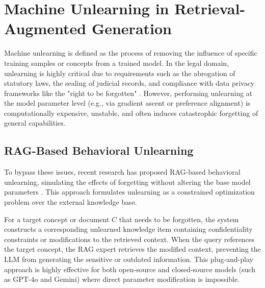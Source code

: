 \section{Machine Unlearning in Retrieval-Augmented Generation}

Machine unlearning is defined as the process of removing the influence of specific training samples or concepts from a trained model. In the legal domain, unlearning is highly critical due to requirements such as the abrogation of statutory laws, the sealing of judicial records, and compliance with data privacy frameworks like the "right to be forgotten" \parencite{11207222}. However, performing unlearning at the model parameter level (e.g., via gradient ascent or preference alignment) is computationally expensive, unstable, and often induces catastrophic forgetting of general capabilities.

\subsection{RAG-Based Behavioral Unlearning}
To bypass these issues, recent research has proposed RAG-based behavioral unlearning, simulating the effects of forgetting without altering the base model parameters \parencite{11207222}. This approach formulates unlearning as a constrained optimization problem over the external knowledge base. 

For a target concept or document $C$ that needs to be forgotten, the system constructs a corresponding unlearned knowledge item containing confidentiality constraints or modifications to the retrieved context. When the query references the target concept, the RAG expert retrieves the modified context, preventing the LLM from generating the sensitive or outdated information. This plug-and-play approach is highly effective for both open-source and closed-source models (such as GPT-4o and Gemini) where direct parameter modification is impossible.

